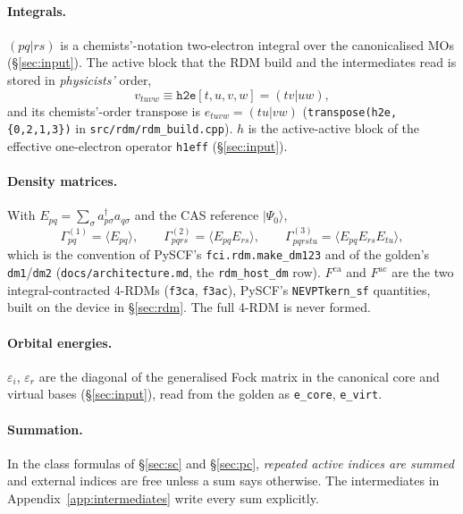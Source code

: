 \documentclass[11pt]{article}
\newcommand{\code}[1]{\texttt{#1}}
\newcommand{\G}[1]{\Gamma^{(#1)}}
\newcommand{\eps}{\varepsilon}
\newcommand{\Fca}{F^{\mathrm{ca}}}
\newcommand{\Fac}{F^{\mathrm{ac}}}
\begin{document}
\paragraph{Integrals.} $(pq|rs)$ is a chemists'-notation two-electron
integral over the canonicalised MOs (\S\ref{sec:input}). The active block that
the RDM build and the intermediates read is stored in \emph{physicists'}
order,
\begin{equation}
  v_{tuvw} \equiv \code{h2e}[t,u,v,w] = (tv|uw),
  \label{eq:h2e}
\end{equation}
and its chemists'-order transpose is $e_{tuvw} = (tu|vw)$
(\code{transpose(h2e, \{0,2,1,3\})} in \code{src/rdm/rdm\_build.cpp}).
$h$ is the active-active block of the effective one-electron operator
\code{h1eff} (\S\ref{sec:input}).

\paragraph{Density matrices.} With $E_{pq} = \sum_\sigma
a^\dagger_{p\sigma}a_{q\sigma}$ and the CAS reference $|\Psi_0\rangle$,
\begin{equation}
  \G1_{pq} = \langle E_{pq}\rangle,\qquad
  \G2_{pqrs} = \langle E_{pq}E_{rs}\rangle,\qquad
  \G3_{pqrstu} = \langle E_{pq}E_{rs}E_{tu}\rangle,
  \label{eq:rdm}
\end{equation}
which is the convention of PySCF's \code{fci.rdm.make\_dm123} and of the
golden's \code{dm1}/\code{dm2} (\code{docs/architecture.md}, the
\code{rdm\_host\_dm} row). $\Fca$ and $\Fac$ are the two
integral-contracted 4-RDMs (\code{f3ca}, \code{f3ac}), PySCF's
\code{NEVPTkern\_sf} quantities, built on the device in
\S\ref{sec:rdm}. The full 4-RDM is never formed.

\paragraph{Orbital energies.} $\eps_i$, $\eps_r$ are the diagonal of the
generalised Fock matrix in the canonical core and virtual bases
(\S\ref{sec:input}), read from the golden as \code{e\_core}, \code{e\_virt}.

\paragraph{Summation.} In the class formulas of \S\ref{sec:sc} and
\S\ref{sec:pc}, \emph{repeated active indices are summed} and external indices
are free unless a sum says otherwise. The intermediates in
Appendix~\ref{app:intermediates} write every sum explicitly.
\end{document}

